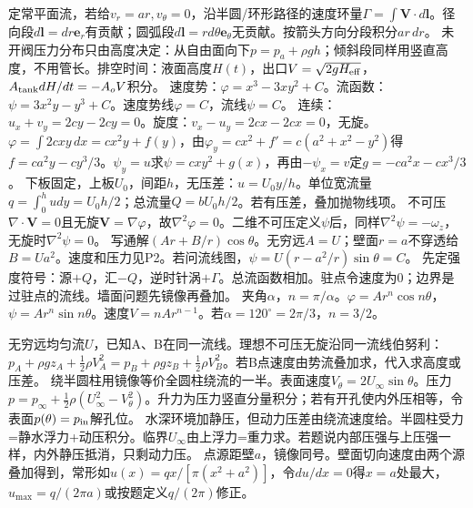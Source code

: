 定常平面流，若给$v_r=ar,v_\theta=0$，沿半圆/环形路径的速度环量$\Gamma=\int\bm V\cdot d\bm l$。径向段$d\bm l=dr\bm e_r$有贡献；圆弧段$d\bm l=rd\theta\bm e_\theta$无贡献。按箭头方向分段积分$ar\,dr$。
未开阀压力分布只由高度决定：从自由面向下$p=p_a+\rho gh$；倾斜段同样用竖直高度，不用管长。排空时间：液面高度$H(t)$，出口$V=\sqrt{2gH_{\rm eff}}$，$A_{\rm tank}dH/dt=-A_oV$积分。
速度势：$\varphi=x^3-3xy^2+C$。流函数：$\psi=3x^2y-y^3+C$。速度势线$\varphi=C$，流线$\psi=C$。
连续：$u_x+v_y=2cy-2cy=0$。旋度：$v_x-u_y=2cx-2cx=0$，无旋。$\varphi=\int2cxy\,dx=cx^2y+f(y)$，由$\varphi_y=cx^2+f'=c(a^2+x^2-y^2)$得$f=ca^2y-cy^3/3$。$\psi_y=u$求$\psi=cxy^2+g(x)$，再由$-\psi_x=v$定$g=-ca^2x-cx^3/3$。
下板固定，上板$U_0$，间距$h$，无压差：$u=U_0y/h$。单位宽流量$q=\int_0^h udy=U_0h/2$；总流量$Q=bU_0h/2$。若有压差，叠加抛物线项。
不可压$\nabla\cdot\bm V=0$且无旋$\bm V=\nabla\varphi$，故$\nabla^2\varphi=0$。二维不可压定义$\psi$后，同样$\nabla^2\psi=-\omega_z$，无旋时$\nabla^2\psi=0$。
写通解$(Ar+B/r)\cos\theta$。无穷远$A=U$；壁面$r=a$不穿透给$B=Ua^2$。速度和压力见P2。若问流线图，$\psi=U(r-a^2/r)\sin\theta=C$。
先定强度符号：源$+Q$，汇$-Q$，逆时针涡$+\Gamma$。总流函数相加。驻点令速度为0；边界是过驻点的流线。墙面问题先镜像再叠加。
夹角$\alpha$，$n=\pi/\alpha$。$\varphi=Ar^n\cos n\theta$，$\psi=Ar^n\sin n\theta$。速度$V=nAr^{n-1}$。若$\alpha=120^\circ=2\pi/3$，$n=3/2$。

无穷远均匀流$U$，已知A、B在同一流线。理想不可压无旋沿同一流线伯努利：$p_A+\rho gz_A+\frac12\rho V_A^2=p_B+\rho gz_B+\frac12\rho V_B^2$。若B点速度由势流叠加求，代入求高度或压差。
绕半圆柱用镜像等价全圆柱绕流的一半。表面速度$V_\theta=2U_\infty\sin\theta$。压力$p=p_\infty+\frac12\rho(U_\infty^2-V_\theta^2)$。升力为压力竖直分量积分；若有开孔使内外压相等，令表面$p(\theta)=p_{\rm in}$解孔位。
水深环境加静压，但动力压差由绕流速度给。半圆柱受力=静水浮力+动压积分。临界$U_\infty$由上浮力=重力求。若题说内部压强与上压强一样，内外静压抵消，只剩动力压。
点源距壁$a$，镜像同号。壁面切向速度由两个源叠加得到，常形如$u(x)=q x/[\pi(x^2+a^2)]$，令$du/dx=0$得$x=a$处最大，$u_{\max}=q/(2\pi a)$或按题定义$q/(2\pi)$修正。

